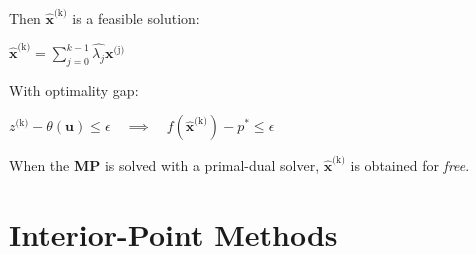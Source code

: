 \documentclass[english]{latex4ei/latex4ei_sheet}
\begin{document}
\begin{sectionbox}
	Then $\hat{\bm{x}}^{\text{(k)}}$ is a feasible solution: \\
	\begin{center}
		$\hat{\bm{x}}^{\text{(k)}} = \sum\limits_{j=0}^{k-1} \hat{\lambda_j} \bm{x}^{\text{(j)}}$
	\end{center}
	With optimality gap: \\
	\begin{center}
		$z^{\text{(k)}} - \theta(\bm{u}) \leq \epsilon \quad \implies \quad f(\hat{\bm{x}}^{\text{(k)}}) - p^* \leq \epsilon $
	\end{center}
	When the \textbf{MP} is solved with a primal-dual solver, $\hat{\bm{x}}^{\text{(k)}}$ is obtained for \textit{free}.

\end{sectionbox}

\section{Interior-Point Methods}
\end{document}
